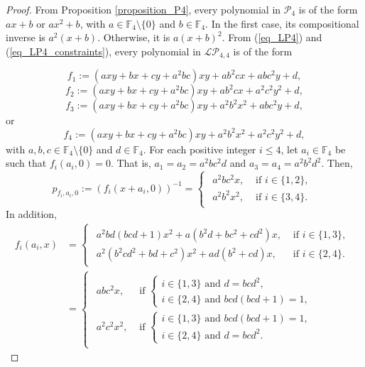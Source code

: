 \documentclass[pdflatex,sn-mathphys-num]{sn-jnl}
\theoremstyle{thmstyleone}%
\begin{document}
\begin{proof} From Proposition \ref{proposition_P4}, every polynomial in $\mathcal{P}_4$ is of the form  $ax+b$ or $ax^2+b$, with $a\in\mathbb{F}_4\setminus\{0\}$ and $b\in\mathbb{F}_4$. In the first case, its compositional inverse is $a^2(x+b)$. Otherwise, it is $a(x+b)^2$. From (\ref{eq_LP4}) and (\ref{eq_LP4_constraints}), every polynomial in $\mathcal{LP}_{4,4}$ is of the form

\[f_1:=\left(axy+bx+cy+a^2bc\right)xy+ab^2cx+abc^2y+d,\]
\[f_2:=\left(axy+bx+cy+a^2bc\right)xy+ab^2cx+a^2c^2y^2+d,\]
\[f_3:=\left(axy+bx+cy+a^2bc\right)xy+a^2b^2x^2+abc^2y+d,\]
or
\[f_4:=\left(axy+bx+cy+a^2bc\right)xy+a^2b^2x^2+a^2c^2y^2+d,\]
with $a,b,c\in\mathbb{F}_4\setminus\{0\}$ and $d\in\mathbb{F}_4$. For each positive integer $i\leq 4$, let $a_i\in\mathbb{F}_4$ be such that $f_i(a_i,0)=0$. That is, $a_1=a_2=a^2bc^2d$ and $a_3=a_4=a^2b^2d^2$. Then,
\[p_{f_i,a_i,0}:=\left(f_i(x+a_i,0)\right)^{-1}=\begin{cases}
    \begin{array}{ll}
    a^2bc^2x, & \text{ if } i\in\{1,2\},\\
    a^2b^2x^2, & \text{ if } i\in\{3,4\}.   
    \end{array}
\end{cases}\]
In addition,
\begin{align*}f_i(a_i,x) & =\begin{cases}
    \begin{array}{ll}
    a^2bd(bcd+1)x^2+a(b^2d+bc^2+cd^2)x, & \text{ if } i\in\{1,3\},\\
    a^2(b^2cd^2+bd+c^2)x^2+ad(b^2+cd)x
, & \text{ if } i\in\{2,4\}.
    \end{array}
\end{cases}\\
& = \begin{cases}\begin{array}{ll}
    abc^2x, & \text{ if } \begin{cases}i\in\{1,3\} \text{ and } d=bcd^2,\\
    i\in\{2,4\} \text{ and } bcd(bcd+1)=1,
    \end{cases}\\
    a^2c^2x^2, & \text{ if } \begin{cases}
     i\in\{1,3\} \text{ and } bcd(bcd+1)=1,\\
     i\in\{2,4\} \text{ and } d=bcd^2.
    \end{cases}
    \end{array}
    \end{cases}

\end{align*}
\end{proof}
\end{document}
